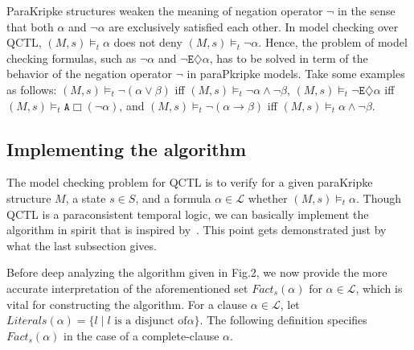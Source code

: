 \documentclass{entcs}
\begin{document}
ParaKripke structures weaken the  meaning of negation operator
$\neg$ in the sense that both $\alpha$ and $\neg\alpha$ are
exclusively satisfied each other. In model checking over QCTL,
$(M,s)\models_t\alpha$ does not deny $(M,s)\models_t\neg\alpha$.
Hence, the problem of model checking formulas, such as
$\neg\alpha$ and $\neg\texttt{E}\diamondsuit\alpha$, has to be
solved in term of the behavior of the negation operator $\neg$ in
paraPkripke models. Take some examples as follows:
$(M,s)\models_t\neg(\alpha\vee\beta)$ iff
$(M,s)\models_t\neg\alpha\wedge\neg\beta$,
$(M,s)\models_t\neg\texttt{E}\diamondsuit\alpha$ iff
$(M,s)\models_t\texttt{A}\Box(\neg\alpha)$, and
$(M,s)\models_t\neg(\alpha\rightarrow\beta)$ iff
$(M,s)\models_t\alpha\wedge\neg\beta$.

\subsection{Implementing the algorithm}\label{MC:algo}

The model checking problem for QCTL is to verify for a given
paraKripke structure $M$, a state $s\in S$, and a formula
$\alpha\in\mathcal{L}$ whether $(M,s)\models_t\alpha$. Though QCTL
is a paraconsistent temporal logic, we can basically implement the
algorithm in spirit that is inspired by~\cite{ALG1}. This point
gets demonstrated just by what the last subsection gives.

Before deep analyzing the algorithm given in Fig.2, we now provide
the more accurate interpretation of the aforementioned set
$Fact_s(\alpha)$ for $\alpha\in\mathcal{L}$, which is vital for
constructing the algorithm. For a clause $\alpha\in\mathcal{L}$,
let $Literals(\alpha)=\{ l\; |\; l\mbox{ is a disjunct of
}\alpha\}$. The following definition specifies
$Fact_s(\alpha)$ in the case of a complete-clause $\alpha$.\\
\end{document}

